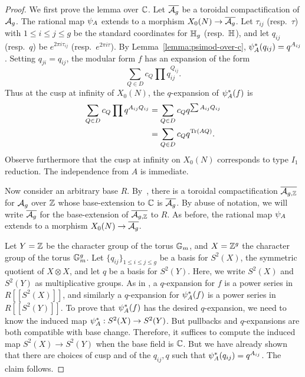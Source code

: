 \documentclass{amsart}
\begin{document}
\begin{proof}
  We first prove the lemma over $\mathbb{C}$. Let $\overline{\mathcal{A}_g}$ be a toroidal compactification of $\mathcal{A}_g$. The rational map $\psi_{A}$ extends to a morphism $X_0(N) \to \overline{\mathcal{A}_g}$. Let $\tau_{ij}$ (resp.~$\tau$) with $1 \leq i \leq j \leq g$ be the standard coordinates for $\mathbb{H}_g$ (resp.~$\mathbb{H}$), and let $q_{ij}$ (resp.~$q$) be $e^{2\pi i \tau_{ij}}$ (resp.~$e^{2\pi i \tau}$). By Lemma~\ref{lemma:psimod-over-c}, $\psi_{A}^*(q_{ij}) = q^{A_{ij}}$. Setting $q_{ji} = q_{ij}$, the modular form $f$ has an expansion of the form
    \[
      \sum_{Q \in D} c_Q \prod q_{ij}^{Q_{ij}}.
    \]
    Thus at the cusp at infinity of $X_0(N)$, the $q$-expansion of $\psi_{A}^*(f)$ is
  \begin{align*}
    \sum_{Q \in D} c_Q \prod q^{A_{ij}Q_{ij}} &= \sum_{Q \in D} c_Q q^{\sum A_{ij}Q_{ij}} \\
    &= \sum_{Q \in D} c_Q q^{\operatorname{Tr}(AQ)}.
  \end{align*}
  Observe furthermore that the cusp at infinity on $X_0(N)$ corresponds to type $I_1$ reduction. The independence from $A$ is immediate.

  Now consider an arbitrary base $R$. By~\cite[IV.5.15]{faltings1990degeneration}, there is a toroidal compactification $\overline{\mathcal{A}_{g,\mathbb{Z}}}$ for $\mathcal{A}_g$ over $\mathbb{Z}$ whose base-extension to $\mathbb{C}$ is $\overline{\mathcal{A}_g}$. By abuse of notation, we will write $\overline{\mathcal{A}_g}$ for the base-extension of $\overline{\mathcal{A}_{g,\mathbb{Z}}}$ to $R$. As before, the rational map $\psi_{A}$ extends to a morphism $X_0(N) \to \overline{\mathcal{A}_g}$.
  
  Let $Y = \mathbb{Z}$ be the character group of the torus $\mathbb{G}_m$, and $X = \mathbb{Z}^g$ the character group of the torus $\mathbb{G}_m^g$. Let $\{ q_{ij}\}_{1 \leq i \leq j \leq g}$ be a basis for $S^2(X)$, the symmetric quotient of $X \otimes X$, and let $q$ be a basis for $S^2(Y)$. Here, we write $S^2(X)$ and $S^2(Y)$ as multiplicative groups. As in \cite[Section V.1]{faltings1990degeneration}, a $q$-expansion for $f$ is a power series in $R[[S^2(X)]]$, and similarly a $q$-expansion for $\psi_{A}^*(f)$ is a power series in $R[[S^2(Y)]]$. To prove that $\psi_{A}^*(f)$ has the desired $q$-expansion, we need to know the induced map $\psi_{A}^*: S^2(X) \to S^2(Y)$. But pullbacks and $q$-expansions are both compatible with base change. Therefore, it suffices to compute the induced map $S^2(X) \to S^2(Y)$ when the base field is $\mathbb{C}$. But we have already shown that there are choices of cusp and of the $q_{ij}, q$ such that $\psi_{A}^*(q_{ij}) = q^{A_{ij}}$. The claim follows.


\end{proof}
\end{document}
